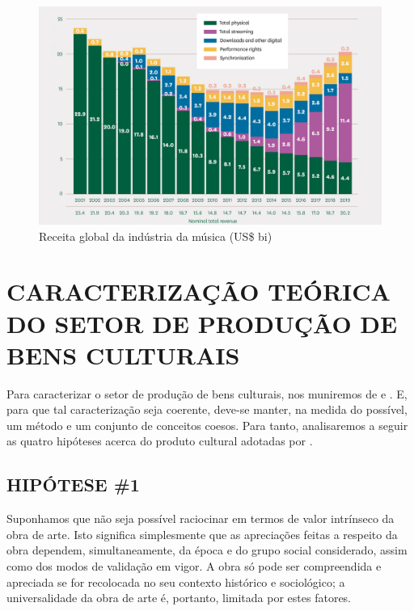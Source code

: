 \documentclass[
]{article}
\newenvironment{citacao}
    {\begin{quoting}[rightmargin=0cm,leftmargin=4cm]
    \begin{singlespace}
    \footnotesize
    }
    {\end{singlespace}
    \end{quoting}
    }
\begin{document}
\begin{figure}
\includegraphics[width=1\linewidth]{img/receitas} \caption{Receita global da indústria da música (US\$ bi)}\label{fig:receitas}
\end{figure}

\hypertarget{caracterizauxe7uxe3o-teuxf3rica-do-setor-de-produuxe7uxe3o-de-bens-culturais}{%
\section{CARACTERIZAÇÃO TEÓRICA DO SETOR DE PRODUÇÃO DE BENS
CULTURAIS}\label{caracterizauxe7uxe3o-teuxf3rica-do-setor-de-produuxe7uxe3o-de-bens-culturais}}

Para caracterizar o setor de produção de bens culturais, nos muniremos
de \citet{bourdieu} e \citet{herscovici}. E, para que tal caracterização
seja coerente, deve-se manter, na medida do possível, um método e um
conjunto de conceitos coesos. Para tanto, analisaremos a seguir as
quatro hipóteses acerca do produto cultural adotadas por
\citet{herscovici}.

\hypertarget{hipuxf3tese-1}{%
\subsection{HIPÓTESE \#1}\label{hipuxf3tese-1}}

\begin{citacao}
Suponhamos que não seja possível raciocinar em termos de valor intrínseco da obra de arte. Isto significa simplesmente que as apreciações feitas a respeito da obra dependem, simultaneamente, da época e do grupo social considerado, assim como dos modos de validação em vigor. A obra só pode ser compreendida e apreciada se for recolocada no seu contexto histórico e sociológico; a universalidade da obra de arte é, portanto, limitada por estes fatores. \citep[p.~30]{herscovici}
\end{citacao}
\end{document}
